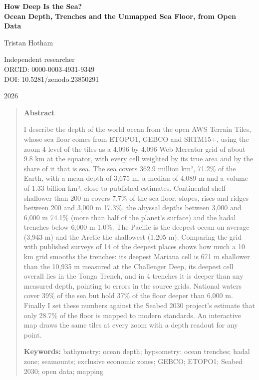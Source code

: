 \documentclass[11pt,a4paper]{article}
\begin{document}
\begin{center}
{\Large\bfseries How Deep Is the Sea?\\[2pt] Ocean Depth, Trenches and the Unmapped Sea Floor, from Open Data\par}
\vspace{1.2em}
{\large Tristan Hotham\par}
\vspace{0.3em}
{\small Independent researcher\\
ORCID: 0000-0003-4931-9349\\
DOI: 10.5281/zenodo.23850291\par}
\vspace{0.8em}
2026
\end{center}

\begin{quote}
\small
\begin{center}\textbf{Abstract}\end{center}
I describe the depth of the world ocean from the open AWS Terrain Tiles, whose sea floor comes from ETOPO1, GEBCO and SRTM15+, using the zoom 4 level of the tiles as a 4,096 by 4,096 Web Mercator grid of about 9.8 km at the equator, with every cell weighted by its true area and by the share of it that is sea. The sea covers 362.9 million km², 71.2\% of the Earth, with a mean depth of 3,675 m, a median of 4,089 m and a volume of 1.33 billion km³, close to published estimates. Continental shelf shallower than 200 m covers 7.7\% of the sea floor, slopes, rises and ridges between 200 and 3,000 m 17.3\%, the abyssal depths between 3,000 and 6,000 m 74.1\% (more than half of the planet's surface) and the hadal trenches below 6,000 m 1.0\%. The Pacific is the deepest ocean on average (3,943 m) and the Arctic the shallowest (1,205 m). Comparing the grid with published surveys of 14 of the deepest places shows how much a 10 km grid smooths the trenches: its deepest Mariana cell is 671 m shallower than the 10,935 m measured at the Challenger Deep, its deepest cell overall lies in the Tonga Trench, and in 4 trenches it is deeper than any measured depth, pointing to errors in the source grids. National waters cover 39\% of the sea but hold 37\% of the floor deeper than 6,000 m. Finally I set these numbers against the Seabed 2030 project's estimate that only 28.7\% of the floor is mapped to modern standards. An interactive map draws the same tiles at every zoom with a depth readout for any point.

\textbf{Keywords:} bathymetry; ocean depth; hypsometry; ocean trenches; hadal zone; seamounts; exclusive economic zones; GEBCO; ETOPO1; Seabed 2030; open data; mapping
\end{quote}
\end{document}
